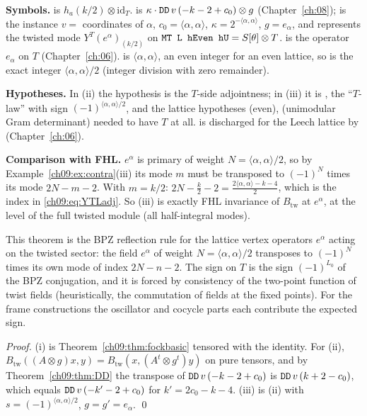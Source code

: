 \begin{dictionary}
\textbf{Symbols.}  is $h_a(k/2)\otimes\mathrm{id}_T$.  is
$\kappa\cdot\lean{DD}\,v\,(-k-2+c_0)\otimes g$ (Chapter~\ref{ch:08});  is
the instance $v=$ coordinates of $\alpha$, $c_0=\langle\alpha,\alpha\rangle$,
$\kappa=2^{-\langle\alpha,\alpha\rangle}$, $g=e_\alpha$, and represents the twisted mode
$Y^T(e^\alpha)_{(k/2)}$ on $\lean{MT L hEven hU}=S[\theta]\otimes T$.  is the
operator $e_\alpha$ on $T$ (Chapter~\ref{ch:06}).  is $\langle\alpha,\alpha\rangle$,
an even integer for an even lattice, so  is the exact integer
$\langle\alpha,\alpha\rangle/2$ (integer division with zero remainder).

\textbf{Hypotheses.} In (ii) the hypothesis  is the $T$-side adjointness; in (iii) it
is , the ``$T$-law'' with sign $(-1)^{\langle\alpha,\alpha\rangle/2}$, and the lattice
hypotheses  (even),  (unimodular Gram determinant) needed to have $T$ at all.
 is discharged for the Leech lattice by  (Chapter~\ref{ch:06}).

\textbf{Comparison with FHL.} $e^\alpha$ is primary of weight $N=\langle\alpha,\alpha\rangle/2$, so
by Example~\ref{ch09:ex:contra}(iii) its mode $m$ must be transposed to $(-1)^N$ times its mode
$2N-m-2$. With $m=k/2$: $2N-\frac k2-2=\frac{2\langle\alpha,\alpha\rangle-k-4}{2}$, which is the
index in \eqref{ch09:eq:YTLadj}. So (iii) is exactly FHL invariance of $B_{\mathrm{tw}}$ at
$e^\alpha$, at the level of the full twisted module (all half-integral modes).
\end{dictionary}
\begin{physics}
This theorem is the BPZ reflection rule for the lattice vertex operators $e^\alpha$ acting on the twisted sector: the field $e^\alpha$ of weight $N=\langle\alpha,\alpha\rangle/2$ transposes to $(-1)^N$ times its own mode of index $2N-n-2$. The sign on $T$ is the sign $(-1)^{L_0}$ of the BPZ conjugation, and it is forced by consistency of the two-point function of twist fields (heuristically, the commutation of fields at the fixed points). For the frame constructions the oscillator and cocycle parts each contribute the expected sign.
\end{physics}

\noindent\emph{Proof.} (i) is Theorem~\ref{ch09:thm:fockbasic} tensored with the identity. For
(ii), $B_{\mathrm{tw}}((A\otimes g)x,y)=B_{\mathrm{tw}}(x,(A^t\otimes g^t)y)$ on pure tensors, and
by Theorem~\ref{ch09:thm:DD} the transpose of $\lean{DD}\,v\,(-k-2+c_0)$ is
$\lean{DD}\,v\,(k+2-c_0)$, which equals $\lean{DD}\,v\,(-k'-2+c_0)$ for $k'=2c_0-k-4$. (iii) is
(ii) with $s=(-1)^{\langle\alpha,\alpha\rangle/2}$, $g=g'=e_\alpha$. \qed

